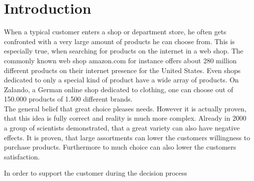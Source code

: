 
\section{Introduction}



When a typical customer enters a shop or department store, he often gets confronted with a very large amount of products he can choose from.
This is especially true, when searching for products on the internet in a web shop.
The commonly known web shop amazon.com for instance offers about 280 million different products on their internet presence for the United States.\citep{marketplaceanalytics:14}
Even shops dedicated to only a special kind of product have a wide array of products.
On Zalando, a German online shop dedicated to clothing, one can choose out of 150.000 products of 1.500 different brands.\citep{visser:14}\\
The general belief that great choice pleases needs.
However it is actually proven, that this idea is fully correct and reality is much more complex.
Already in 2000 a group of scientists demonstrated, that a great variety can also have negative effects.\citep[312]{diehl:2010}
It is proven, that large assortments can lower the customers willingness to purchase products.\citep[313]{diehl:2010}
Furthermore to much choice can also lower the customers satisfaction.\citep[320]{diehl:2010}

In order to support the customer during the decision process 

